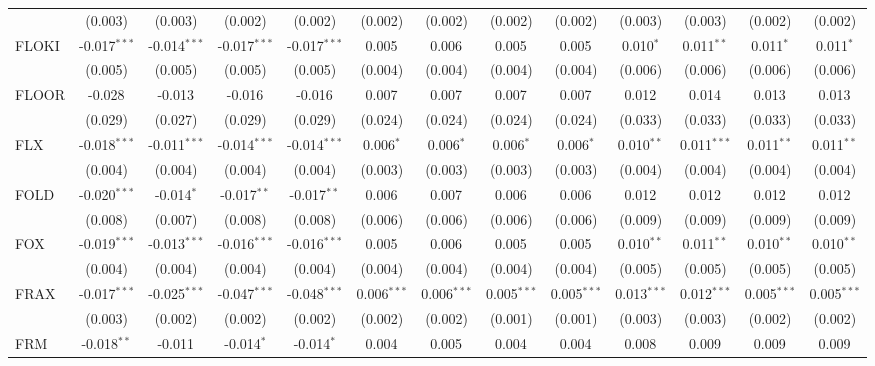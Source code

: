 \begin{table}[!htbp]
\begin{tabular}{@{\extracolsep{5pt}}lcccccccccccc}
  & (0.003) & (0.003) & (0.002) & (0.002) & (0.002) & (0.002) & (0.002) & (0.002) & (0.003) & (0.003) & (0.002) & (0.002) \\
 FLOKI & -0.017$^{***}$ & -0.014$^{***}$ & -0.017$^{***}$ & -0.017$^{***}$ & 0.005$^{}$ & 0.006$^{}$ & 0.005$^{}$ & 0.005$^{}$ & 0.010$^{*}$ & 0.011$^{**}$ & 0.011$^{*}$ & 0.011$^{*}$ \\
  & (0.005) & (0.005) & (0.005) & (0.005) & (0.004) & (0.004) & (0.004) & (0.004) & (0.006) & (0.006) & (0.006) & (0.006) \\
 FLOOR & -0.028$^{}$ & -0.013$^{}$ & -0.016$^{}$ & -0.016$^{}$ & 0.007$^{}$ & 0.007$^{}$ & 0.007$^{}$ & 0.007$^{}$ & 0.012$^{}$ & 0.014$^{}$ & 0.013$^{}$ & 0.013$^{}$ \\
  & (0.029) & (0.027) & (0.029) & (0.029) & (0.024) & (0.024) & (0.024) & (0.024) & (0.033) & (0.033) & (0.033) & (0.033) \\
 FLX & -0.018$^{***}$ & -0.011$^{***}$ & -0.014$^{***}$ & -0.014$^{***}$ & 0.006$^{*}$ & 0.006$^{*}$ & 0.006$^{*}$ & 0.006$^{*}$ & 0.010$^{**}$ & 0.011$^{***}$ & 0.011$^{**}$ & 0.011$^{**}$ \\
  & (0.004) & (0.004) & (0.004) & (0.004) & (0.003) & (0.003) & (0.003) & (0.003) & (0.004) & (0.004) & (0.004) & (0.004) \\
 FOLD & -0.020$^{***}$ & -0.014$^{*}$ & -0.017$^{**}$ & -0.017$^{**}$ & 0.006$^{}$ & 0.007$^{}$ & 0.006$^{}$ & 0.006$^{}$ & 0.012$^{}$ & 0.012$^{}$ & 0.012$^{}$ & 0.012$^{}$ \\
  & (0.008) & (0.007) & (0.008) & (0.008) & (0.006) & (0.006) & (0.006) & (0.006) & (0.009) & (0.009) & (0.009) & (0.009) \\
 FOX & -0.019$^{***}$ & -0.013$^{***}$ & -0.016$^{***}$ & -0.016$^{***}$ & 0.005$^{}$ & 0.006$^{}$ & 0.005$^{}$ & 0.005$^{}$ & 0.010$^{**}$ & 0.011$^{**}$ & 0.010$^{**}$ & 0.010$^{**}$ \\
  & (0.004) & (0.004) & (0.004) & (0.004) & (0.004) & (0.004) & (0.004) & (0.004) & (0.005) & (0.005) & (0.005) & (0.005) \\
 FRAX & -0.017$^{***}$ & -0.025$^{***}$ & -0.047$^{***}$ & -0.048$^{***}$ & 0.006$^{***}$ & 0.006$^{***}$ & 0.005$^{***}$ & 0.005$^{***}$ & 0.013$^{***}$ & 0.012$^{***}$ & 0.005$^{***}$ & 0.005$^{***}$ \\
  & (0.003) & (0.002) & (0.002) & (0.002) & (0.002) & (0.002) & (0.001) & (0.001) & (0.003) & (0.003) & (0.002) & (0.002) \\
 FRM & -0.018$^{**}$ & -0.011$^{}$ & -0.014$^{*}$ & -0.014$^{*}$ & 0.004$^{}$ & 0.005$^{}$ & 0.004$^{}$ & 0.004$^{}$ & 0.008$^{}$ & 0.009$^{}$ & 0.009$^{}$ & 0.009$^{}$ \\

\end{tabular}
\end{table}
